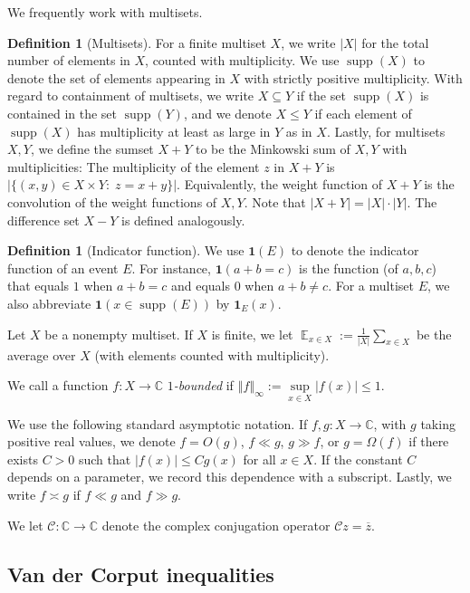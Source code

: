 \documentclass[11pt]{amsart}
\theoremstyle{definition}
\newtheorem{definition}[lemma]{Definition}
\DeclareMathOperator*{\E}{\mathbb{E}}
\newcommand{\C}{{\mathbb C}}
\newcommand{\CC}{{\mathcal C}}
\DeclareMathOperator{\supp}{supp}
\newcommand{\norm}[1]{\left\Vert #1\right\Vert}
\begin{document}
We frequently work with multisets. 
\begin{definition}[Multisets]
For a finite multiset $X$, we write $|X|$ for the total number of elements in $X$, counted with multiplicity.  We use $\supp(X)$ to denote the set of elements appearing in $X$ with strictly positive multiplicity.  With regard to containment of multisets, we write $X \subseteq Y$ if the set $\supp(X)$ is contained in the set $\supp(Y)$, and we denote $X \leq Y$ if each element of $ \supp(X)$ has multiplicity at least as large in $Y$ as in $X$. Lastly, for multisets $X,Y$, we define the sumset $X+Y$ to be the Minkowski sum of $X,Y$ with multiplicities: The multiplicity of the element $z$ in $X+Y$ is $|\{(x,y)\in X\times Y:\; z = x+y\}|$.  Equivalently, the weight function of $X+Y$ is the convolution of the weight functions of $X,Y$.  Note that $|X+Y|=|X| \cdot |Y|$.  The difference set $X-Y$ is defined analogously.     
\end{definition}

\begin{definition}[Indicator function]
    We use $\mathbf{1}(E)$ to denote the indicator function of an event $E$.  For instance, $\mathbf{1}(a + b = c)$ is the function (of $a,b,c$) that equals $1$ when $a+b=c$ and equals $0$ when $a+b\neq c$. For a multiset $E$, we also abbreviate $\mathbf{1}(x\in \supp(E))$ by $\mathbf{1}_E(x)$.    
\end{definition}


Let $X$ be a nonempty multiset. If $X$ is finite, we let $\E_{x\in X} := \frac{1}{|X|}\sum_{x\in X}$ be the average over $X$ (with elements counted with multiplicity).  




We call a function $f:X\to \C$ \textit{$1$-bounded} if $\norm{f}_\infty:=\sup\limits_{x\in X}|f(x)|\leq 1$. 

We use the following standard asymptotic notation. If $f,g: X\to\C$, with $g$ taking positive real values, we denote $f=O(g)$, $f\ll g$, $g\gg f$, or $g = \Omega(f)$ if there exists $C>0$ such that $|f(x)|\leq C g(x)$ for all $x\in X$.  If the constant $C$ depends on a parameter, we record this dependence with a subscript. Lastly, we write $f\asymp g$ if $f\ll g$ and $f\gg g$.


We let $\CC: \C \to \C$ denote the complex conjugation operator $\CC z=\overline{z}$.



\subsection{Van der Corput inequalities}
\end{document}
